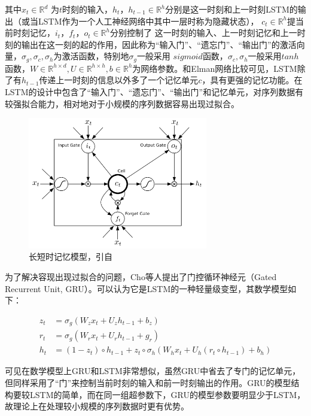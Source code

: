 其中$x_t \in \mathbb{R}^d$ 为$t$时刻的输入，$h_t$，$h_{t-1} \in \mathbb{R}^h$分别是这一时刻和上一时刻LSTM的输出（或当LSTM作为一个人工神经网络中其中一层时称为隐藏状态），
$c_t \in \mathbb{R}^h$提当前时刻记忆，$i_t$，$f_t$，$o_t \in \mathbb{R}^h$分别控制了
这一时刻的输入、上一时刻记忆和上一时刻的输出在这一刻的起的作用，因此称为“输入门”、“遗忘门”、“输出门”的激活向量，$\sigma_g, \sigma_c, \sigma_h$为激活函数，特别地$\sigma_g$一般采用 $sigmoid$函数，$\sigma_c, \sigma_h$一般采用$tanh$函数，$W \in \mathbb{R} ^ {h \times d}, U \in \mathbb{R}^{h \times h}, b \in \mathbb{R} ^ {h}$为网络参数。和Elman网络比较可见，LSTM除了有$h_{t-1}$传递上一时刻的信息以外多了一个记忆单元$c$，具有更强的记忆功能。在LSTM的设计中包含了“输入门”、“遗忘门”、“输出门”和记忆单元，对序列数据有较强拟合能力，相对地对于小规模的序列数据容易出现过拟合。

\begin{figure}[H]
  \centering
  \includegraphics[width=0.7\textwidth]{img/lstm.png}
  \caption{长短时记忆模型，引自\cite{graves2013hybrid}}
  \label{fig:lstm}
\end{figure}

为了解决容现出现过拟合的问题，Cho等人\cite{cho2014learning}提出了门控循环神经元（Gated Recurrent Unit, GRU）。可以认为它是LSTM的一种轻量级变型，其数学模型如下：

\begin{align}
  \label{eq:gru}
  z_t &= \sigma_g (W_z x_t + U_z h_{t-1} + b_z) \\
  r_t &= \sigma_g (W_r x_t + U_r h_{t-1} + g_r) \\
  h_t &= (1 - z_t) \circ h_{t-1} + z_t \circ \sigma_h (W_h x_t + U_h (r_t \circ h_{t-1}) + b_h) 
\end{align}

可见在数学模型上GRU和LSTM非常想似，虽然GRU中省去了专门的记忆单元，但同样采用了“门”来控制当前时刻的输入和前一时刻输出的作用。GRU的模型结构要较LSTM的简单，而在同一组超参数下，GRU的模型参数要明显少于LSTM，故理论上在处理较小规模的序列数据时更有优势。

